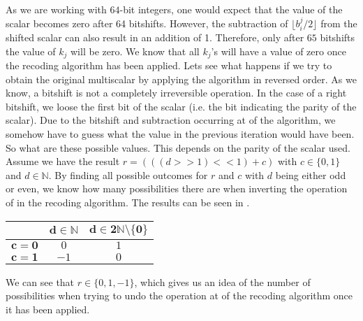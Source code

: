 As we are working with $64$-bit integers, one would expect that the value of the scalar becomes zero after 64 bitshifts. However, the subtraction of $\lfloor  b_i^j / 2 \rfloor$ from the shifted scalar can also result in an addition of 1.
Therefore, only after $65$ bitshifts the value of $k_j$ will be zero.
We know that all $k_j$'s will have a value of zero once the recoding algorithm has been applied.
Lets see what happens if we try to obtain the original multiscalar by applying the algorithm in reversed order.
As we know, a bitshift is not a completely irreversible operation.
In the case of a right bitshift, we loose the first bit of the scalar (i.e. the bit indicating the parity of the scalar).
Due to the bitshift and subtraction occurring at  of the algorithm, we somehow have to guess what the value in the previous iteration would have been.
So what are these possible values.
This depends on the parity of the scalar used.
Assume we have the result $r = (((d >> 1) << 1) + c)$ with $c \in \{0, 1\}$ and $d \in \mathbb{N}$.
By finding all possible outcomes for $r$ and $c$ with $d$ being either odd or even, we know how many possibilities there are when inverting the operation of  in the recoding algorithm. 
The results can be seen in .
%
\begin{table}
	\centering
	\begin{tabular}{*3c}
		\toprule
		& $\bm{d \in \mathbb{N}}$ & $\bm{d \in 2\mathbb{N} \setminus \{0\} }$ \\
		\midrule
		$\bm{c = 0}$ & $0$ & $1$ \\
		$\bm{c = 1}$ & $-1$ & $0$ \\
		\bottomrule
	\end{tabular}
	\label{tbl: inversion of floor function}
\end{table}
%
We can see that $r \in \{0, 1, -1\}$, which gives us an idea of the number of possibilities when trying to undo the operation at  of the recoding algorithm once it has been applied.
